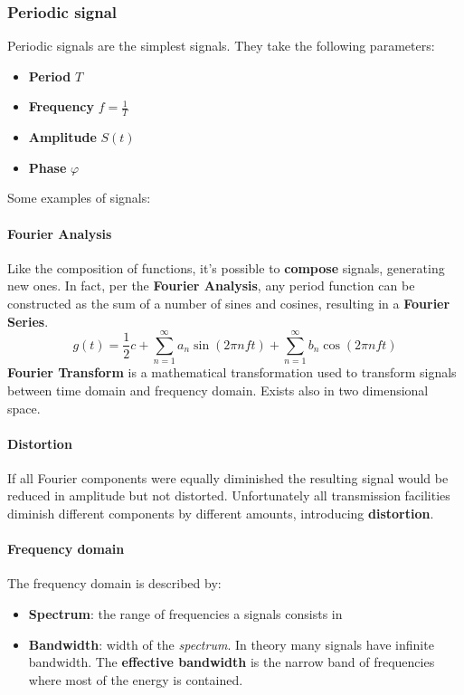 \newpage
\subsubsection{Periodic signal}
Periodic signals are the simplest signals. They take the following parameters:
\begin{itemize}
	\item \textbf{Period} $T$
	\item \textbf{Frequency} $f=\frac{1}{T}$
	\item \textbf{Amplitude} $S(t)$
	\item \textbf{Phase} $\varphi$
\end{itemize}

\begin{example}
	Some examples of signals:
	\begin{figure}[!h]
		\hfil
		\hfil
		\hfil
	\end{figure}
\end{example}

\paragraph{Fourier Analysis} Like the composition of functions, it's possible to \textbf{compose} signals, generating new ones. In fact, per the \textbf{Fourier Analysis}, any period function can be constructed as the sum of a number of sines and cosines, resulting in a \textbf{Fourier Series}.
\begin{equation}
	g(t)=\frac{1}{2} c + \sum_{n=1}^{\infty} a_n \sin(2\pi nft) + \sum_{n=1}^{\infty}b_n \cos(2\pi nft)
\end{equation}
\textbf{Fourier Transform} is a mathematical transformation used to transform signals between time domain and frequency domain. Exists also in two dimensional space.
\paragraph{Distortion} If all Fourier components were equally diminished the resulting signal would be reduced in amplitude but not distorted. Unfortunately all transmission facilities diminish different components by different amounts, introducing \textbf{distortion}.

\paragraph{Frequency domain} The frequency domain is described by:
\begin{itemize}
	\item \textbf{Spectrum}: the range of frequencies a signals consists in
	\item \textbf{Bandwidth}: width of the \textit{spectrum}. In theory many signals have infinite bandwidth. The \textbf{effective bandwidth} is the narrow band of frequencies where most of the energy is contained.
\end{itemize}

